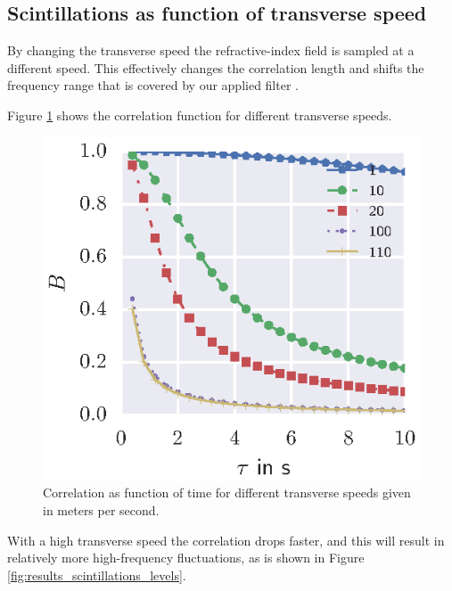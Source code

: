 \subsection{Scintillations as function of transverse speed}
By changing the transverse speed the refractive-index field is sampled at a
different speed. This effectively changes the correlation length and shifts the frequency range that is covered by our applied filter \cite{Wilson1999}.

Figure \ref{fig:results_scintillations_correlation} shows the correlation function for
different transverse speeds.
\begin{figure}[H]
  \centering
  \includegraphics[]{../figures/manual/turbulence-model/correlation}
  \caption{Correlation as function of time for different transverse speeds given in meters per second.}
  \label{fig:results_scintillations_correlation}
\end{figure}
With a high transverse speed the correlation drops
faster, and this will result in relatively more high-frequency fluctuations, as is shown in Figure \ref{fig:results_scintillations_levels}.
